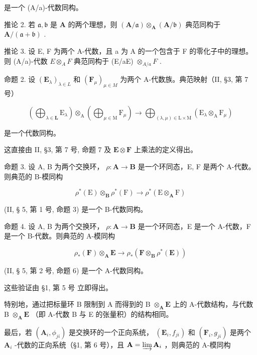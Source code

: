 是一个 (A/a)-代数同构。

推论 2. 若 \(\mathfrak{a},\mathfrak{b}\) 是 \(\mathbf{A}\) 的两个理想，则 \((\mathbf{A} / \mathfrak{a})\otimes_{\mathbf{A}}(\mathbf{A} / \mathfrak{b})\) 典范同构于 \(\mathbf{A} / (\mathfrak{a} + \mathfrak{b})\) .

推论 3. 设 E, F 为两个 A-代数，且 a 为 A 的一个包含于 F 的零化子中的理想。则 (A/a)-代数 \(E \otimes_{A} F\) 典范同构于 (E/aE) \(\otimes_{A/a} F\) .

命题 2. 设 \((\mathbf{E}_{\lambda})_{\lambda \in L}\) 和 \((\mathbf{F}_{\mu})_{\mu \in M}\) 为两个 A-代数族。典范映射（II, §3, 第 7 号）

\[
\left(\bigoplus_ {\lambda \in \mathbf {L}} \mathrm{E} _ {\lambda}\right) \otimes_ {\mathrm{A}} \left(\bigoplus_ {\mu \in \mathrm{M}} \mathrm{F} _ {\mu}\right)\rightarrow \bigoplus_ {(\lambda , \mu) \in \mathrm{L} \times \mathrm{M}} \left(\mathrm{E} _ {\lambda} \otimes_ {\mathrm{A}} \mathrm{F} _ {\mu}\right)
\]

是一个代数同构。

这直接由 II, §3, 第 7 号, 命题 7 及 \(\mathbf{E} \otimes \mathbf{F}\) 上乘法的定义得出。

命题 3. 设 A, B 为两个交换环， \(\rho: \mathbf{A} \to \mathbf{B}\) 是一个环同态，E, F 是两个 A-代数。则典范的 B-模同构

\[
\rho^ {*} (\mathrm{E}) \otimes_ {\mathbf {B}} \rho^ {*} (\mathrm{F}) \rightarrow \rho^ {*} (\mathrm{E} \otimes_ {\mathbf {A}} \mathrm{F})
\]

(II, § 5, 第 1 号, 命题 3) 是一个 B-代数同构。

命题 4. 设 A, B 为两个交换环， \(\rho: \mathbf{A} \to \mathbf{B}\) 是一个环同态，E 是一个 A-代数，F 是一个 B-代数。则典范的 A-模同构

\[
\rho_ {*} (\mathbf {F}) \otimes_ {\mathbf {A}} \mathbf {E} \rightarrow \rho_ {*} (\mathbf {F} \otimes_ {\mathbf {B}} \rho^ {*} (\mathbf {E}))
\]

(II, § 5, 第 2 号, 命题 6) 是一个 A-代数同构。

这些验证由 §1, 第 5 号 立即得出。

特别地，通过把标量环 B 限制到 A 而得到的 B \(\otimes_{\mathbf{A}} \mathbf{E}\) 上的 A-代数结构，与代数 B \(\otimes_{\mathbf{A}} \mathbf{E}\) （即 A-代数 B 与 E 的张量积）的结构相同。

最后，若 \((\mathbf{A}_i, \phi_{ji})\) 是交换环的一个正向系统， \((\mathbf{E}_i, f_{ji})\) 和 \((\mathbf{F}_i, g_{ji})\) 是两个 \(\mathbf{A}_i\) -代数的正向系统（§1, 第 6 号），且 \(\mathbf{A} = \varinjlim \mathbf{A}_i\) ，则典范的 A-模同构

